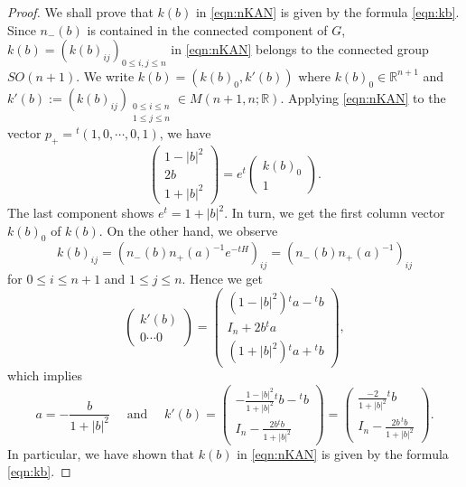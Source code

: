 \begin{proof}
We shall prove 
 that $k(b)$ in \eqref{eqn:nKAN} is given
 by the formula \eqref{eqn:kb}.  
Since $n_-(b)$ is contained 
 in the connected component of $G$, 
$k(b)=(k(b)_{ij})_{0 \le i,j \le n}$
 in \eqref{eqn:nKAN}
 belongs to the connected group $SO(n+1)$.  
We write $k(b)=(k(b)_0, k'(b))$
 where $k(b)_0 \in {\mathbb{R}}^{n+1}$
 and $
  k'(b):=(k(b)_{ij})_{\substack {0 \le i \le n \\ 1 \le j \le n}}
  \in M(n+1,n;{\mathbb{R}})
$.  
Applying \eqref{eqn:nKAN} to the vector
 $p_+ ={}^{t\!} (1,0,\cdots,0,1)$, 
we have
\[
\begin{pmatrix}
1-|b|^2 \\ 2 b\\ 1+|b|^2
\end{pmatrix}
=
e^t
\begin{pmatrix}
k(b)_0 \\ 1
\end{pmatrix}.  
\]
The last component shows
 $e^t=1+|b|^2$.  
In turn, 
 we get the first column vector $k(b)_0$ of $k(b)$.  
On the other hand, 
 we observe 
\[
  k(b)_{i j}
  = 
  (n_-(b) n_+(a)^{-1} e^{-t H})_{ij}
  =
  (n_-(b) n_+(a)^{-1} )_{ij}
\]
for $0 \le i \le n+1$ and $1 \le j \le n$.  
Hence we get
\[
\begin{pmatrix}
k'(b)
\\
 0 \cdots 0
\end{pmatrix}
=
\begin{pmatrix}
(1-|b|^2) {}^{t\!}a-{}^{t\!}b
\\
I_n +2 b {}^{t\!}a
\\
(1+|b|^2) {}^{t\!}a + {}^{t\!}b
\end{pmatrix}, 
\]
which implies
\[
  a=-\frac{b}{1+|b|^2}
\quad
\text{ and }
\quad
  k'(b)
  =\begin{pmatrix}
   -\frac{1-|b|^2}{1+|b|^2} {}^{t\!}b-{}^{t\!}b
  \\
   I_n -\frac{2 b {}^{t\!}b}{1+|b|^2}
   \end{pmatrix}
  =\begin{pmatrix}
   \frac{-2}{1+|b|^2}{}^{t\!}b
   \\
   I_n-\frac{2 b\, {}^{t\!}b}{1+|b|^2}
   \end{pmatrix}.
\]
In particular,
  we have shown 
 that $k(b)$ in \eqref{eqn:nKAN} is given by the formula \eqref{eqn:kb}.  
\end{proof}

